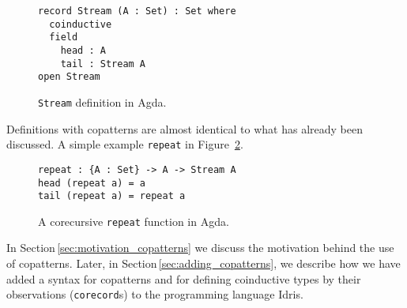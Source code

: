\begin{figure}[h]
\begin{lstlisting}[mathescape]
record Stream (A : Set) : Set where
  coinductive
  field
    head : A
    tail : Stream A
open Stream
\end{lstlisting}
\caption{\texttt{Stream} definition in Agda.}
\label{fig:agda_stream}
\end{figure}

Definitions with copatterns are almost identical to what has already been
discussed. A simple example \texttt{repeat} in Figure~\ref{fig:agda_repeat}. 

\begin{figure}[h]
\begin{lstlisting}[mathescape]
repeat : {A : Set} -> A -> Stream A
head (repeat a) = a
tail (repeat a) = repeat a 
\end{lstlisting}
\caption{A corecursive \texttt{repeat} function in Agda.}
\label{fig:agda_repeat}
\end{figure}

In Section\,\ref{sec:motivation_copatterns} we discuss the motivation behind the
use of copatterns. Later, in Section\,\ref{sec:adding_copatterns}, we describe
how we have added a syntax for copatterns and for defining coinductive types by
their observations (\texttt{corecord}s) to the programming language Idris.
